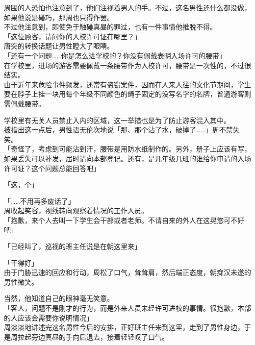 周围的人恐怕也注意到了，他们注视着男人的手。不过，这名男性还什么都没做，如果他说是碰巧，那周也只得作罢。\\

不过他注意到，即使免于触碰真昼的罪过，也有一件事情他推脱不得。\\

「这位顾客，请问你的入校许可证在哪里？」\\

唐突的转换话题让男性瞪大了眼睛。\\

「还有一个问题……你是怎么进学校的？你没有佩戴表明入场许可的腰带」\\

在学校里，进场的游客需要佩戴一条腰带作为入校许可，腰带是一次性的，不过很结实。\\

由于近年来危险事件频发，还常有盗窃案件，因而在人来人往的文化节期间，学生要在脖子上挂一块用每个年级不同颜色的绳子固定的没写名字的名牌，普通游客则需佩戴腰带。

学校里有无关人员禁止入内的区域，这一举措也是为了防止游客混入其中。\\

被指出这一点后，男性语无伦次地说「那、那个沾了水，破掉了……」周不禁失笑。\\

「奇怪了，考虑到可能沾到汗，腰带是用防水纸制作的。另外，册子上应该有写，如果丢失可以补发，届时请向本部登记。还有，是几年级几班的谁给你申请的入场许可证？这个问题总能回答吧」

「这，个」

「……不用再多废话了」\\

周收起笑容，视线转向观察着情况的工作人员。\\

「抱歉，来个人去叫一下学生会干部或者老师。不请自来的外人在这晃悠可不好吧」

「已经叫了，巡视的班主任说是在朝这里来」

「干得好」\\

由于门胁迅速的回应和行动，周松了口气，耸耸肩，然后端正态度，朝痴汉未遂的男性微笑。

当然，他知道自己的眼神毫无笑意。\\

「客人，问题不是刚才的行为，而是外来人员未经许可进校的事情。很抱歉，本部的人应该会需要你说明情况」\\

周淡淡地讲述完这名男性今后的安排，正好班主任来到这里，走到了男性身边，于是周拉起旁边真昼的手向后退去，接着轻轻叹了口气。\\

